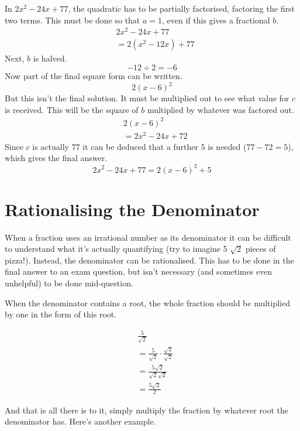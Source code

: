 In $2x^2-24x+77$, the quadratic has to be partially factorised, factoring the first two terms. This must be done so that $a=1$, even if this gives a fractional $b$.
\begin{align*}
	&2x^2-24x+77\\
	&=2(x^2-12x)+77
\end{align*}
Next, $b$ is halved.
\begin{equation*}
	-12 \div 2 = -6
\end{equation*}
Now part of the final square form can be written.
\begin{equation*}
	2(x-6)^2
\end{equation*}
But this isn't the final solution. It must be multiplied out to see what value for $c$ is received. This will be the square of $b$ multiplied by whatever was factored out.
\begin{align*}
	&2(x-6)^2\\
	&=2x^2-24x+72
\end{align*}
Since $c$ is actually $77$ it can be deduced that a further $5$ is needed ($77-72=5$), which gives the final answer.
\begin{equation*}
	2x^2 - 24x + 77 = 2(x-6)^2+5
\end{equation*}

\section{Rationalising the Denominator}
When a fraction uses an irrational number as its denominator it can be difficult to understand what it's actually quantifying (try to imagine 5 $\sqrt{2}$ pieces of pizza!). Instead, the denominator can be rationalised. This has to be done in the final answer to an exam question, but isn't necessary (and sometimes even unhelpful) to be done mid-question.

When the denominator contains a root, the whole fraction should be multiplied by one in the form of this root.

\begin{align*}
	&\frac{5}{\sqrt{2}}\\
	&=\frac{5}{\sqrt{2}} \cdot \frac{\sqrt{2}}{\sqrt{2}}\\
	&=\frac{5\sqrt{2}}{\sqrt{2}\sqrt{2}}\\
	&=\frac{5\sqrt{2}}{2}
\end{align*}

And that is all there is to it, simply multiply the fraction by whatever root the denominator has. Here's another example.


